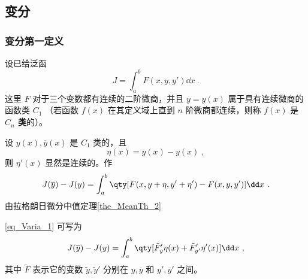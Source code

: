 \subsection{变分}\label{sub_Varia_1}
\subsubsection{变分第一定义}
设已给泛函
\begin{equation}
J=\int_a^b F(x,y,y')\dd x~.
\end{equation}
这里 $F$ 对于三个变数都有连续的二阶微商，并且 $y=y(x)$ 属于具有连续微商的函数类 $C_1$ （若函数 $f(x)$ 在其定义域上直到 $n$ 阶微商都连续，则称 $f(x)$ 是\textbf{ $C_n$ 类}的）。

设 $y(x),\overline{y}(x)$ 是 $C_1$ 类的，且
\begin{equation}
\eta(x)=\overline{y}(x)-y(x)~,
\end{equation}
则 $\eta'(x)$ 显然是连续的。作
\begin{equation}\label{eq_Varia_1}
J(\overline{y})-J(y)=\int_a^b\qty[F(x,y+\eta,y'+\eta')-F(x,y,y')]\dd x~.
\end{equation}
由拉格朗日微分中值定理\autoref{the_MeanTh_2}~
\begin{issues}
\end{issues}
\autoref{eq_Varia_1} 可写为
\begin{equation}
J(\overline{y})-J(y)=\int_a^b\qty[\tilde{F}'_y\eta(x)+\tilde{F}'_{y'}\eta'(x)]\dd x~,
\end{equation}
其中 $\tilde{F}$ 表示它的变数 $\tilde{y},\tilde{y}'$ 分别在 $y,\overline{y}$ 和 $y',\overline{y}'$ 之间。

